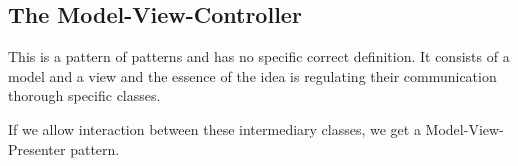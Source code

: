 \documentclass[a4paper, 12pt, twoside]{article}
\begin{document}
\subsection{The Model-View-Controller}

This is a pattern of patterns and has no specific correct definition.
It consists of a model and a view and the essence of the idea is 
regulating their communication thorough specific classes.

\vspace{\baselineskip}

If we allow interaction between these intermediary classes, we get
a Model-View-Presenter pattern. 
\end{document}
